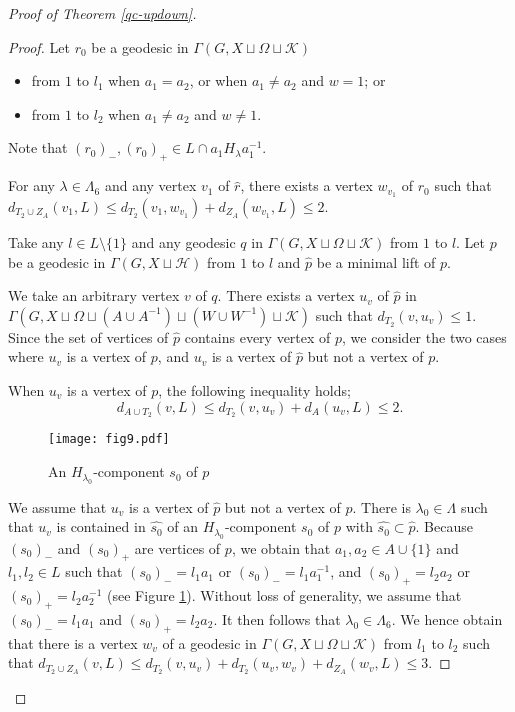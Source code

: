 \documentclass{amsart}
\theoremstyle{definition}
\begin{document}
\begin{proof}[Proof of Theorem \ref{qc-updown}]
\begin{proof}
Let $r_0$ be a geodesic in $\Gamma(G,X\sqcup\Omega\sqcup{\mathcal K})$
\begin{itemize}
\item from $1$ to $l_1$ when $a_1=a_2$, or when $a_1\ne a_2$ and $w=1$; or 
\item from $1$ to $l_2$ when $a_1\ne a_2$ and $w \ne 1$.
\end{itemize}
Note that $(r_0)_-, (r_0)_+\in L\cap a_1 H_\lambda a_1^{-1}$. 

For any $\lambda \in \Lambda_6$ and any vertex $v_1$ of $\widehat r$, there exists a vertex $w_{v_1}$ of $r_0$ such that $d_{T_2\cup Z_A}(v_1,L)\leq d_{T_2}(v_1,w_{v_1})+d_{Z_A}(w_{v_1},L)\leq 2$. 

Take any $l\in L\setminus \{1\}$ and any geodesic $q$ in $\Gamma(G,X\sqcup \Omega\sqcup {\mathcal K})$ from $1$ to $l$. 
Let $p$ be a geodesic in $\Gamma(G,X\sqcup{\mathcal H})$ from $1$ to $l$ and $\widehat p$ be a minimal lift of $p$. 

We take an arbitrary vertex $v$ of $q$. 
There exists a vertex $u_v$ of $\widehat p$ in $\Gamma(G,X\sqcup\Omega\sqcup (A \cup A^{-1})\sqcup (W \cup W^{-1})\sqcup{\mathcal K})$ such that $d_{T_2}(v,u_v)\leq 1$. 
Since the set of vertices of $\widehat{p}$ contains every vertex of $p$, we consider the two cases where $u_v$ is a vertex of $p$, and $u_v$ is a vertex of $\widehat{p}$ but not a vertex of $p$. 

When $u_v$ is a vertex of $p$, the following inequality holds; 
$$
d_{A\cup T_2}(v,L)\leq d_{T_2}(v,u_v)+d_{A}(u_v,L)\leq 2. 
$$

\begin{figure}[top]
\begin{center}
\texttt{[image: fig9.pdf]}
\end{center}
\caption{An $H_{\lambda_0}$-component $s_0$ of $p$}
\label{fig9}
\end{figure}

We assume that $u_v$ is a vertex of $\widehat{p}$ but not a vertex of $p$.
There is $\lambda_0\in \Lambda$ such that $u_v$ is contained in $\widehat{s_0}$ of an $H_{\lambda_0}$-component $s_0$ of $p$ with $\widehat{s_0} \subset \widehat p$. 
Because $(s_0)_-$ and $(s_0)_+$ are vertices of $p$, we obtain that $a_1,a_2\in A \cup \{1\}$ and $l_1,l_2\in L$ such that $(s_0)_-=l_1a_1$ or $(s_0)_-=l_1a_1^{-1}$, and $(s_0)_+=l_2a_2$ or $(s_0)_+=l_2a_2^{-1}$ (see Figure \ref{fig9}). 
Without loss of generality, we assume that $(s_0)_-=l_1a_1$ and $(s_0)_+=l_2a_2$. 
It then follows that $\lambda_0\in\Lambda_6$. 
We hence obtain that there is a vertex $w_v$ of a geodesic in $\Gamma(G,X\sqcup \Omega\sqcup{\mathcal K})$ from $l_1$ to $l_2$ such that $d_{T_2\cup Z_A}(v,L)\leq d_{T_2}(v,u_v)+d_{T_2}(u_v,w_v)+d_{Z_A}(w_v,L)\leq 3$. 
\end{proof}


\end{proof}
\end{document}
